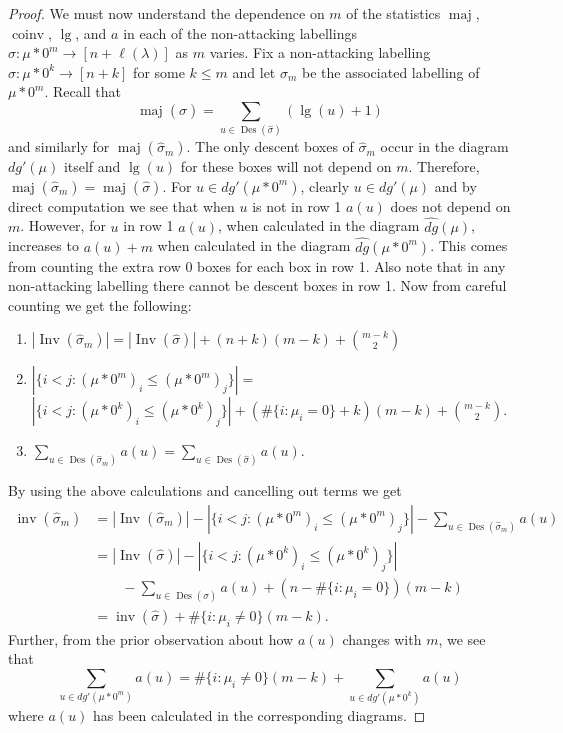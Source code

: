 \documentclass[11pt]{article}
\theoremstyle{definition}
\numberwithin{equation}{section}
\DeclareMathOperator{\Des}{Des}
\DeclareMathOperator{\maj}{maj}
\DeclareMathOperator{\Inv}{Inv}
\DeclareMathOperator{\inv}{inv}
\DeclareMathOperator{\coinv}{coinv}
\DeclareMathOperator{\mathleg}{lg}
\begin{document}
\begin{proof}
  We must now understand the dependence on $m$ of the statistics $\maj$, $\coinv$, $\mathleg$, and $a$ in each of the non-attacking labellings $\sigma: \mu*0^m \rightarrow [n+\ell(\lambda)]$ as $m$ varies. Fix a non-attacking labelling $\sigma: \mu * 0^k \rightarrow [n+k]$ for some $k \leq m$ and let $\sigma_m$ be the associated labelling of $\mu * 0^m$. Recall that 
  $$\maj(\widehat{\sigma}) = \sum_{u \in \Des(\widehat{\sigma})} (\mathleg(u) + 1)$$
  and similarly for $\maj(\widehat{\sigma}_m).$
  The only descent boxes of $\widehat{\sigma}_m$ occur in the diagram $dg'(\mu)$ itself and $\mathleg(u)$ for these boxes will not depend on $m$. Therefore, $\maj(\widehat{\sigma}_m) = \maj(\widehat{\sigma})$. For $u \in dg'(\mu * 0^m)$, clearly $u \in dg'(\mu)$ and by direct computation we see that when $u$ is not in row 1 $a(u)$ does not depend on $m$. However, for $u$ in row 1 $a(u)$, when calculated in the diagram $\widehat{dg}(\mu)$, increases to $a(u)+m$ when calculated in the diagram $\widehat{dg}(\mu*0^m)$. This comes from counting the extra row 0 boxes for each box in row 1. Also note that in any non-attacking labelling there cannot be descent boxes in row 1. Now from careful counting we get the following:
  \begin{enumerate}
      \item $|\Inv(\widehat{\sigma}_m)| = |\Inv(\widehat{\sigma})| + (n+k)(m-k) + \binom{m-k}{2}$ \\
      \item $|\{i<j : (\mu * 0^m)_i \leq (\mu * 0^m)_j \} | =$ \\ $| \{i<j : (\mu*0^k)_i \leq (\mu*0^k)_j \} | + (\#\{i:\mu_i = 0\} +k)(m-k) + \binom{m-k}{2}$. \\
      \item $\sum_{u \in \Des(\widehat{\sigma}_m)} a(u) = \sum_{u \in \Des(\widehat{\sigma})} a(u).$
  \end{enumerate}
By using the above calculations and cancelling out terms we get
\begin{align*}
    \inv(\widehat{\sigma}_m) &= |\Inv(\widehat{\sigma}_m)| - | \{i<j: (\mu * 0^m)_i \leq (\mu * 0^m)_j \} | - \sum_{u \in \Des(\widehat{\sigma}_m)} a(u) \\
    &= |\Inv(\widehat{\sigma})| - | \{i<j: (\mu*0^k)_i \leq (\mu*0^k)_j \} | \\
    & \qquad - \sum_{u \in \Des(\widehat{\sigma})} a(u) + (n- \#\{i:\mu_i = 0\})(m-k)\\
    &= \inv(\widehat{\sigma}) +\#\{i:\mu_i \neq 0\}(m-k).
\end{align*} 
Further, from the prior observation about how  $a(u)$ changes with $m$, we see that 
  $$\sum_{u \in dg'(\mu * 0^m)} a(u) = \#\{i:\mu_i \neq 0\}(m-k) + \sum_{u \in dg'(\mu*0^k)} a(u)$$
  where $a(u)$ has been calculated in the corresponding diagrams. 


\end{proof}
\end{document}
